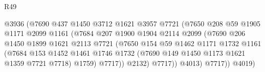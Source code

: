 \begin{lexlean}{R49}
\begin{coremodule}
                                        @3936
                                        (@7690
                                          @437
                                          @1450
                                          @3712
                                          @1621
                                          @3957
                                          @7721
                                          (@7650
                                            @208
                                            @59
                                            @1905
                                            @1171
                                            @2099
                                            @1161
                                            (@7684
                                              @207
                                              @1900
                                              @1904
                                              @2114
                                              @2099
                                              (@7690
                                                @206
                                                @1450
                                                @1899
                                                @1621
                                                @2113
                                                @7721
                                                (@7650
                                                  @154
                                                  @59
                                                  @1462
                                                  @1171
                                                  @1732
                                                  @1161
                                                  (@7684
                                                    @153
                                                    @1452
                                                    @1461
                                                    @1746
                                                    @1732
                                                    (@7690 @149 @1450 @1173 @1621 @1359 @7721 @7718)
                                                    @1759)
                                                  @7717))
                                              @2132)
                                            @7717))
                                        @4013)
                                      @7717))
                                  @4019)

\end{coremodule}
\end{lexlean}
